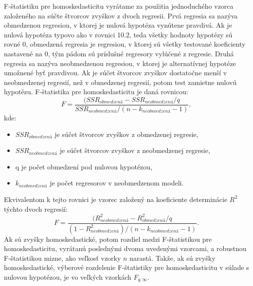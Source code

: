 \documentclass[]{tukediphc}
\begin{document}
F-štatistiku pre homoskedasticitu vyrátame za použitia jednoduchého vzorca založeného na súčte štvorcov zvyškov z dvoch regresii. Prvá regresia sa nazýva obmedzenou regresiou, v ktorej je nulová hypotéza vynútene pravdivá. Ak je nulová hypotéza typovo ako v rovnici 10.2, teda všetky hodnoty hypotézy sú rovné 0, obmedzená regresia je regresiou, v ktorej sú všetky testované koeficienty nastavené na 0, tým pádom sú príslušné regresory vylúčené z regresie. Druhá regresia sa nazýva neobmedzenou regresiou, v ktorej je alternatívnej hypotéze umožnené byť pravdivou. Ak je súčet štvorcov zvyškov dostatočne menší v neobmedzenej regresií, než v obmedzenej regresií, potom test zamietne nulovú hypotézu. 
F-štatistika pre homoskedasticitu je daná rovnicou:
\begin{equation}
    F= \frac{(SSR_{obmedzená}-SSR_{neobmedzená} / q}{SSR_{neobmedzená}/ (n-k_{neobmedzená}-1)},
\end{equation}
kde:
\begin{itemize}
    \item $SSR_{obmedzená}$ je súčet štvorcov zvyškov z obmedzenej regresie, \item$SSR_{neobmedzená}$ je súčet štvorcov zvyškov z neobmedzenej regresie, 
    \item q je počet obmedzení pod nulovou hypotézou,
    \item $k_{neobmedzená}$ je počet regresorov v neobmedzenom modeli.
\end{itemize}
Ekvivalentom k tejto rovnici je vzorec založený na koeficiente determinácie $R^2$ týchto dvoch regresií:
\begin{equation}
    F= \frac{(R^2_{neobmedzená}-R^2_{obmedzená} / q}{(1 - R^2_{neobmedzená})/ (n-k_{neobmedzená}-1)}.
\end{equation}
Ak sú zvyšky homoskedastické, potom rozdiel medzi F-štatistikou pre homoskedasticitu, vyrátanú poslednými dvoma uvedenými vzorcami, a robustnou F-štatistikou mizne, ako veľkosť vzorky $n$ narastá. Takže, ak sú zvyšky homoskedastické, výberové rozdelenie F-štatistiky pre homoskedasticitu v súlade s nulovou hypotézou, je vo veľkých vzorkách $F_{q,\infty}$. 
\end{document}
